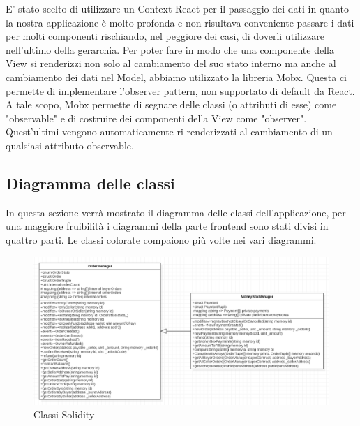 E' stato scelto di utilizzare un Context React per il passaggio dei dati in quanto la nostra applicazione è
molto profonda e non risultava conveniente passare i dati per molti componenti rischiando, nel peggiore
dei casi, di doverli utilizzare nell'ultimo della gerarchia.
Per poter fare in modo che una componente della View si renderizzi non solo al cambiamento del
suo stato interno ma anche al cambiamento dei dati nel Model, abbiamo utilizzato la libreria Mobx.
Questa ci permette di implementare l'observer pattern, non supportato di default da React. A tale
scopo, Mobx permette di segnare delle classi (o attributi di esse) come "observable" e di costruire
dei componenti della View come "observer". Quest'ultimi vengono automaticamente ri-renderizzati al
cambiamento di un qualsiasi attributo observable.

\subsection{Diagramma delle classi}

In questa sezione verrà mostrato il diagramma delle classi dell'applicazione, 
per una maggiore fruibilità i diagrammi della parte frontend sono stati divisi in quattro parti.
Le classi colorate compaiono più volte nei vari diagrammi.

\begin{figure}[H]
    \begin{center}
    \includegraphics[scale=0.5]{immagini/smartcontracts.png}
    \caption{Classi Solidity}
    \end{center}
\end{figure}

